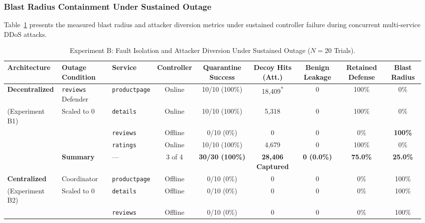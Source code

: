 \subsubsection{Blast Radius Containment Under Sustained Outage}
Table~\ref{tab:scenario3_blast_radius} presents the measured blast radius and attacker diversion metrics under sustained controller failure during concurrent multi-service DDoS attacks.

\begin{table}[!t]
\renewcommand{\arraystretch}{1.2}
\caption{Experiment B: Fault Isolation and Attacker Diversion Under Sustained Outage ($N=20$ Trials).}
\label{tab:scenario3_blast_radius}
\centering
\footnotesize
\setlength{\tabcolsep}{5pt}
\begin{tabular}{@{}l l l c c c c c c@{}}
\toprule
\textbf{Architecture} & \textbf{Outage Condition} & \textbf{Service} & \textbf{Controller} & \textbf{Quarantine Success} & \textbf{Decoy Hits (Att.)} & \textbf{Benign Leakage} & \textbf{Retained Defense} & \textbf{Blast Radius} \\
\midrule
\textbf{Decentralized} & \texttt{reviews} Defender & \texttt{productpage} & Online  & 10/10 (100\%) & 18,409\textsuperscript{*} & 0 & 100\% & 0\% \\
(Experiment B1)        & Scaled to 0               & \texttt{details}     & Online  & 10/10 (100\%) & 5,318                     & 0 & 100\% & 0\% \\
                       &                           & \texttt{reviews}     & Offline & 0/10 (0\%)    & 0                         & 0 & 0\%   & \textbf{100\%} \\
                       &                           & \texttt{ratings}     & Online  & 10/10 (100\%) & 4,679                     & 0 & 100\% & 0\% \\
\cmidrule(l){3-9}
                       & \textbf{Summary}          & —                    & 3 of 4  & \textbf{30/30 (100\%)} & \textbf{28,406 Captured} & \textbf{0 (0.0\%)} & \textbf{75.0\%} & \textbf{25.0\%} \\
\midrule
\textbf{Centralized}   & Coordinator               & \texttt{productpage} & Offline & 0/10 (0\%)    & 0                         & 0 & 0\%   & 100\% \\
(Experiment B2)        & Scaled to 0               & \texttt{details}     & Offline & 0/10 (0\%)    & 0                         & 0 & 0\%   & 100\% \\
                       &                           & \texttt{reviews}     & Offline & 0/10 (0\%)    & 0                         & 0 & 0\%   & 100\% \\

\end{tabular}
\end{table}
